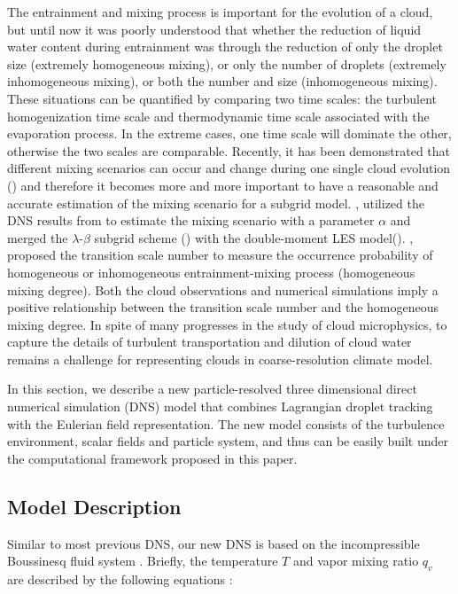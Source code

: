The entrainment and mixing process is important for the evolution of a cloud, but until now it was poorly understood that whether the reduction of liquid water content during entrainment was through the reduction of only the droplet size (extremely homogeneous mixing), or only the number of droplets (extremely inhomogeneous mixing), or both the number and size (inhomogeneous mixing). These situations can be quantified by comparing two time scales: the turbulent homogenization time scale and thermodynamic time scale associated with the evaporation process. In the extreme cases, one time scale will dominate the other, otherwise the two scales are comparable. Recently, it has been demonstrated that different mixing scenarios can occur and change during one single cloud evolution (\cite{And09,Burnet07,Lehmann09}) and therefore it becomes more and more important to have a reasonable and accurate estimation of the mixing scenario for a subgrid model. \cite{Jarecka2013}, utilized the DNS results from \cite{And04,And06,And09}  to estimate the mixing scenario with a parameter $\alpha$ and merged the $\lambda$-$\beta$ subgrid scheme (\cite{Jarecka2009}) with the double-moment LES model(\cite{Morrison2008}). \cite{Lu2013}, proposed the transition scale number to measure the occurrence probability of homogeneous or inhomogeneous entrainment-mixing process (homogeneous mixing degree). Both the cloud observations and numerical simulations imply a positive relationship between the transition scale number and the homogeneous mixing degree. In spite of many progresses in the study of cloud microphysics, to capture the details of turbulent transportation and dilution of cloud water remains a challenge for representing clouds in coarse-resolution climate model.

In this section, we describe a new particle-resolved three dimensional direct numerical simulation (DNS) model that combines Lagrangian droplet tracking with the Eulerian field representation. The new model consists of the turbulence environment, scalar fields and particle system, and thus can be easily built under the computational framework proposed in this paper.

\subsection{Model Description}
Similar to most previous DNS, our new DNS is based on the incompressible
Boussinesq fluid system \cite{And04}. Briefly, the temperature $T$ and vapor
mixing ratio $q_v$ are described by the following equations \cite{Kumar11}:

